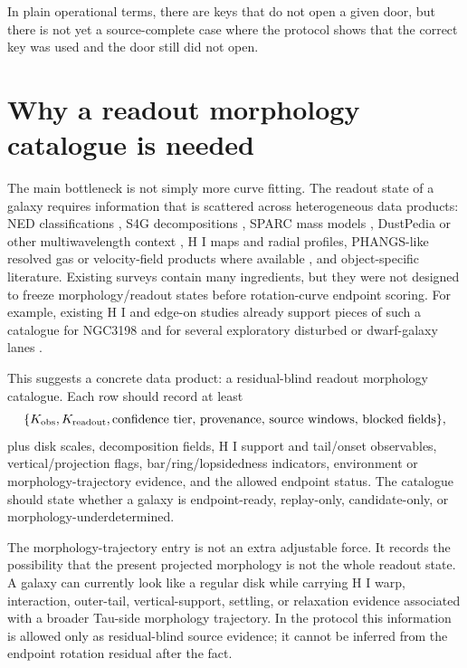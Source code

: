 \documentclass[11pt]{article}
\begin{document}
In plain operational terms, there are keys that do not open a given door, but
there is not yet a source-complete case where the protocol shows that the
correct key was used and the door still did not open.

\section{Why a readout morphology catalogue is needed}

The main bottleneck is not simply more curve fitting.  The readout state of a
galaxy requires information that is scattered across heterogeneous data
products: NED classifications \cite{NED}, S4G decompositions
\cite{Sheth2010S4G}, SPARC mass models \cite{Lelli2016SPARC}, DustPedia or
other multiwavelength context \cite{Davies2017DustPedia}, H I maps and radial
profiles, PHANGS-like resolved gas or velocity-field products where available
\cite{Leroy2021PHANGSALMA}, and object-specific literature.  Existing surveys
contain many ingredients, but they were not designed to freeze
morphology/readout states before rotation-curve endpoint scoring.
For example, existing H I and edge-on studies already support pieces of such a
catalogue for NGC3198 \cite{Begeman1989NGC3198HI,Gentile2013HALOGASNGC3198,Schmidt2016THINGSRadialGas}
and for several exploratory disturbed or dwarf-galaxy lanes
\cite{deBlok2020IC2574HI,WalterBrinks1999IC2574Holes,SanchezSalcedo2002IC2574Holes,Swaters2009LateTypeDwarfs}.

This suggests a concrete data product: a residual-blind readout morphology
catalogue.  Each row should record at least
\[
\{K_{\rm obs},K_{\rm readout},\hbox{confidence tier, provenance, source windows,
blocked fields}\},
\]
plus disk scales, decomposition fields, H I support and tail/onset observables,
vertical/projection flags, bar/ring/lopsidedness indicators, environment or
morphology-trajectory evidence, and the allowed endpoint status.  The catalogue should
state whether a galaxy is endpoint-ready, replay-only, candidate-only, or
morphology-underdetermined.

The morphology-trajectory entry is not an extra adjustable force.  It records
the possibility that the present projected morphology is not the whole readout
state.  A galaxy can currently look like a regular disk while carrying H I
warp, interaction, outer-tail, vertical-support, settling, or relaxation
evidence associated with a broader Tau-side morphology trajectory.  In the
protocol this information is allowed only as residual-blind source evidence; it
cannot be inferred from the endpoint rotation residual after the fact.
\end{document}
